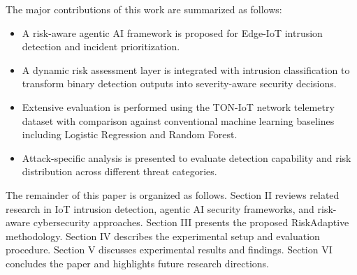 The major contributions of this work are summarized as follows:

\begin{itemize}
\item A risk-aware agentic AI framework is proposed for Edge-IoT
intrusion detection and incident prioritization.

\item A dynamic risk assessment layer is integrated with intrusion
classification to transform binary detection outputs into
severity-aware security decisions.

\item Extensive evaluation is performed using the TON-IoT network
telemetry dataset with comparison against conventional machine
learning baselines including Logistic Regression and Random Forest.

\item Attack-specific analysis is presented to evaluate detection
capability and risk distribution across different threat categories.
\end{itemize}

The remainder of this paper is organized as follows. Section II
reviews related research in IoT intrusion detection, agentic AI
security frameworks, and risk-aware cybersecurity approaches. Section
III presents the proposed RiskAdaptive methodology. Section IV
describes the experimental setup and evaluation procedure. Section V
discusses experimental results and findings. Section VI concludes the
paper and highlights future research directions.
